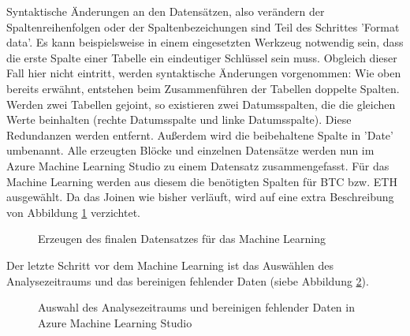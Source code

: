 Syntaktische Änderungen an den Datensätzen, also verändern der Spaltenreihenfolgen oder der Spaltenbezeichungen sind Teil des Schrittes 'Format data'. Es kann beispielsweise in einem eingesetzten Werkzeug notwendig sein, dass die erste Spalte einer Tabelle ein eindeutiger Schlüssel sein muss.\citep[S.~46]{chapman_crisp-dm_2000} Obgleich dieser Fall hier nicht eintritt, werden syntaktische Änderungen vorgenommen: Wie oben bereits erwähnt, entstehen beim Zusammenführen der Tabellen doppelte Spalten. Werden zwei Tabellen gejoint, so existieren zwei Datumsspalten, die die gleichen Werte beinhalten (rechte Datumsspalte und linke Datumsspalte). Diese Redundanzen werden entfernt. Außerdem wird die beibehaltene Spalte in 'Date' umbenannt.\newline
Alle erzeugten Blöcke und einzelnen Datensätze werden nun im Azure Machine Learning Studio zu einem Datensatz zusammengefasst. Für das Machine Learning werden aus diesem die benötigten Spalten für BTC bzw. ETH ausgewählt. Da das Joinen wie bisher verläuft, wird auf eine extra Beschreibung von Abbildung \ref{fig:azureFinalSet} verzichtet.
\begin{figure}[H]
\centering
{}
\caption{Erzeugen des finalen Datensatzes für das Machine Learning}
\label{fig:azureFinalSet}
\end{figure}
Der letzte Schritt vor dem Machine Learning ist das Auswählen des Analysezeitraums und das bereinigen fehlender Daten (siebe Abbildung \ref{fig:azureDateAndCleaning}).
\begin{figure}[H]
\centering
{}
\caption{Auswahl des Analysezeitraums und bereinigen fehlender Daten in Azure Machine Learning Studio}
\label{fig:azureDateAndCleaning}
\end{figure}
